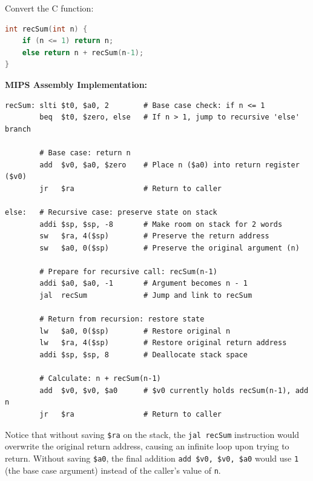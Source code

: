 \begin{example}
Convert the C function:
\begin{lstlisting}[language=C]
int recSum(int n) {
    if (n <= 1) return n;
    else return n + recSum(n-1);
}
\end{lstlisting}

\textbf{MIPS Assembly Implementation:}
\begin{lstlisting}
recSum: slti $t0, $a0, 2        # Base case check: if n <= 1
        beq  $t0, $zero, else   # If n > 1, jump to recursive 'else' branch
        
        # Base case: return n
        add  $v0, $a0, $zero    # Place n ($a0) into return register ($v0)
        jr   $ra                # Return to caller
        
else:   # Recursive case: preserve state on stack
        addi $sp, $sp, -8       # Make room on stack for 2 words
        sw   $ra, 4($sp)        # Preserve the return address
        sw   $a0, 0($sp)        # Preserve the original argument (n)
        
        # Prepare for recursive call: recSum(n-1)
        addi $a0, $a0, -1       # Argument becomes n - 1
        jal  recSum             # Jump and link to recSum
        
        # Return from recursion: restore state
        lw   $a0, 0($sp)        # Restore original n
        lw   $ra, 4($sp)        # Restore original return address
        addi $sp, $sp, 8        # Deallocate stack space
        
        # Calculate: n + recSum(n-1)
        add  $v0, $v0, $a0      # $v0 currently holds recSum(n-1), add n
        jr   $ra                # Return to caller
\end{lstlisting}
\end{example}

\begin{remark}
Notice that without saving \texttt{\$ra} on the stack, the \texttt{jal recSum} instruction would overwrite the original return address, causing an infinite loop upon trying to return. Without saving \texttt{\$a0}, the final addition \texttt{add \$v0, \$v0, \$a0} would use \texttt{1} (the base case argument) instead of the caller's value of \texttt{n}.
\end{remark}
